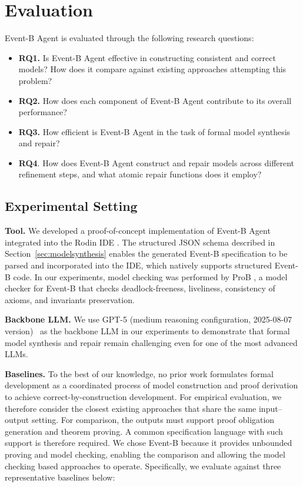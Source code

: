 \section{Evaluation}

Event-B Agent is evaluated through the following research questions:
\begin{itemize}
    \item \textbf{RQ1.} Is Event-B Agent effective in constructing consistent and correct models? How does it compare against existing approaches attempting this problem?
    \item \textbf{RQ2.} How does each component of Event-B Agent contribute to its overall performance?
    \item \textbf{RQ3.} How efficient is Event-B Agent in the task of formal model synthesis and repair?
    \item \textbf{RQ4}. How does Event-B Agent construct and repair models across different refinement steps, and what atomic repair functions does it employ?
\end{itemize}

\subsection{Experimental Setting} \label{sec:evalsetting}
\textbf{Tool.}
We developed a proof-of-concept implementation of Event-B Agent integrated into the Rodin IDE \cite{rodin}.
The structured JSON schema described in Section~\ref{sec:modelsynthesis} enables the generated Event-B specification to be parsed and incorporated into the IDE, which natively supports structured Event-B code.
In our experiments, model checking was performed by ProB \cite{ProB}, a model checker for Event-B that checks deadlock-freeness, liveliness, consistency of axioms, and invariants preservation.

\noindent\textbf{Backbone LLM.}
We use GPT-5 (medium reasoning configuration, 2025-08-07 version)~\cite{openai_gpt5} as the backbone LLM in our experiments to demonstrate that formal model synthesis and repair remain challenging even for one of the most advanced LLMs.

\noindent
\textbf{Baselines.}
To the best of our knowledge, no prior work formulates formal development as a coordinated process of model construction and proof derivation to achieve correct-by-construction development.
For empirical evaluation, we therefore consider the closest existing approaches that share the same input–output setting.
For comparison, the outputs must support proof obligation generation and theorem proving.
A common specification language with such support is therefore required.
We chose Event-B because it provides unbounded proving and model checking, enabling the comparison and allowing the model checking based approaches to operate.
Specifically, we evaluate against three representative baselines below:

